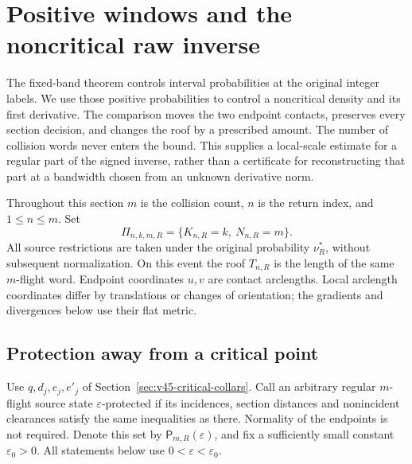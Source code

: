 \section{Positive windows and the noncritical raw inverse}
\label{sec:v46-window-transport}
The fixed-band theorem controls interval probabilities at the original
integer labels. We use those positive probabilities to control a
noncritical density and its first derivative. The comparison moves the
two endpoint contacts, preserves every section decision, and changes
the roof by a prescribed amount. The number of collision words never
enters the bound. This supplies a local-scale estimate for a regular
part of the signed inverse, rather than a certificate for reconstructing
that part at a bandwidth chosen from an unknown derivative norm.

Throughout this section $m$ is the collision count, $n$ is the return
index, and $1\le n\le m$. Set
\[
 \Pi_{n,k,m,R}=\{K_{n,R}=k,\ N_{n,R}=m\}.
\]
All source restrictions are taken under the original probability
$\nu_R^*$, without subsequent normalization. On this event the roof
$T_{n,R}$ is the length of the same $m$-flight word. Endpoint coordinates
$u,v$ are contact arclengths. Local arclength coordinates differ by
translations or changes of orientation; the gradients and divergences
below use their flat metric.

\subsection{Protection away from a critical point}
Use $q,d_j,e_j,e'_j$ of Section~\ref{sec:v45-critical-collars}. Call an
arbitrary regular $m$-flight source state $\varepsilon$-protected if its
incidences, section distances and nonincident clearances satisfy the
same inequalities as there. Normality of the endpoints is not required.
Denote this set by $\mathsf P_{m,R}(\varepsilon)$, and fix a sufficiently
small constant $\varepsilon_0>0$. All statements below use
$0<\varepsilon<\varepsilon_0$.

